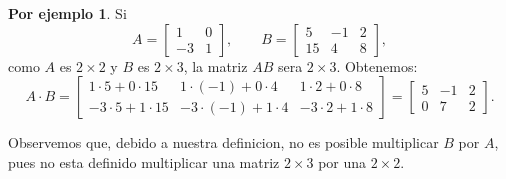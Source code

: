 \documentclass{article}
\theoremstyle{definition}
\theoremstyle{definition}
\newtheorem*{ej}{Por ejemplo}
\theoremstyle{remark}
\begin{document}
  \begin{ej}
  Si \[
    A=\begin{bmatrix}1 & 0 \\ -3 & 1 \end{bmatrix}, \quad \quad B=\begin{bmatrix}5 & -1 & 2 \\ 15 & 4 & 8 \end{bmatrix},
  \]
  como $A$ es $2 \times 2$ y $B$ es $2 \times 3$, la matriz $AB$ sera $2 \times 3$. Obtenemos: \[
    A\cdot B = \begin{bmatrix} 1 \cdot 5 + 0 \cdot 15 & 1 \cdot (-1) + 0 \cdot 4 & 1 \cdot 2 + 0 \cdot 8 \\
    -3 \cdot 5 + 1 \cdot 15 & -3 \cdot (-1) + 1 \cdot 4 & -3 \cdot 2 + 1 \cdot 8 \end{bmatrix} 
    = 
      \begin{bmatrix} 5 & -1 & 2 \\ 0 & 7 & 2 \end{bmatrix}.
  \]
  \end{ej}
  Observemos que, debido a nuestra definicion, no es posible multiplicar $B$ por $A$, pues no esta definido multiplicar una matriz $2 \times 3$ por una $2 \times 2$.
\end{document}
